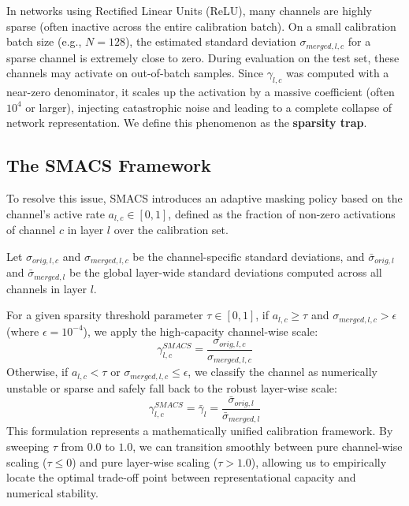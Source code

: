 \documentclass{article}
\theoremstyle{plain}
\theoremstyle{definition}
\theoremstyle{remark}
\begin{document}
In networks using Rectified Linear Units (ReLU), many channels are highly sparse (often inactive across the entire calibration batch). On a small calibration batch size (e.g., $N=128$), the estimated standard deviation $\sigma_{merged, l, c}$ for a sparse channel is extremely close to zero. During evaluation on the test set, these channels may activate on out-of-batch samples. Since $\gamma_{l, c}$ was computed with a near-zero denominator, it scales up the activation by a massive coefficient (often $10^4$ or larger), injecting catastrophic noise and leading to a complete collapse of network representation. We define this phenomenon as the \textbf{sparsity trap}.

\subsection{The SMACS Framework}
To resolve this issue, SMACS introduces an adaptive masking policy based on the channel's active rate $a_{l,c} \in [0, 1]$, defined as the fraction of non-zero activations of channel $c$ in layer $l$ over the calibration set.

Let $\sigma_{orig, l, c}$ and $\sigma_{merged, l, c}$ be the channel-specific standard deviations, and $\bar{\sigma}_{orig, l}$ and $\bar{\sigma}_{merged, l}$ be the global layer-wide standard deviations computed across all channels in layer $l$. 

For a given sparsity threshold parameter $\tau \in [0, 1]$, if $a_{l,c} \geq \tau$ and $\sigma_{merged, l, c} > \epsilon$ (where $\epsilon = 10^{-4}$), we apply the high-capacity channel-wise scale:
\begin{equation}
    \gamma_{l,c}^{SMACS} = \frac{\sigma_{orig, l, c}}{\sigma_{merged, l, c}}
\end{equation}
Otherwise, if $a_{l,c} < \tau$ or $\sigma_{merged, l, c} \leq \epsilon$, we classify the channel as numerically unstable or sparse and safely fall back to the robust layer-wise scale:
\begin{equation}
    \gamma_{l,c}^{SMACS} = \bar{\gamma}_l = \frac{\bar{\sigma}_{orig, l}}{\bar{\sigma}_{merged, l}}
\end{equation}
This formulation represents a mathematically unified calibration framework. By sweeping $\tau$ from $0.0$ to $1.0$, we can transition smoothly between pure channel-wise scaling ($\tau \leq 0$) and pure layer-wise scaling ($\tau > 1.0$), allowing us to empirically locate the optimal trade-off point between representational capacity and numerical stability.
\end{document}
